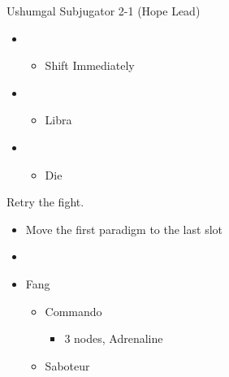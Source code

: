 \begin{multicols}{2}
  \begin{battle}{Ushumgal Subjugator 2-1 (Hope Lead)}
    \begin{itemize}
      \item \first
            \begin{itemize}
              \item Shift Immediately
            \end{itemize}
      \item \second
            \begin{itemize}
              \item Libra
            \end{itemize}
      \item \third
            \begin{itemize}
              \item Die
            \end{itemize}
    \end{itemize}
  \end{battle}
  Retry the fight.
  \begin{menu}
    \begin{itemize}
      \paradigm
      \begin{itemize}
        \item Move the first paradigm to the last slot
        \item {}%
              {\paradigmline{[\com]}{\com}{\rav}}
              {\paradigmline{\com}{\rav}{(\rav)}}%
              {\paradigmline[3]{\textit{(\sab)}}{\textit{(\rav)}}{\textit{\rav}}}%
              {\paradigmline{\sen}{(\rav)}{(\rav)}}%
              {\paradigmline{\sab}{(\rav)}{\syn}}%
              {\paradigmline{\com}{\rav}{\rav}}
      \end{itemize}
      \crystarium
      \begin{itemize}
        \item Fang
              \begin{itemize}
                \item Commando
                      \begin{itemize}
                        \item 3 nodes, Adrenaline
                      \end{itemize}
                \item Saboteur
                      \begin{itemize}

\end{itemize}
\end{itemize}
\end{itemize}
\end{itemize}
\end{menu}
\end{multicols}
